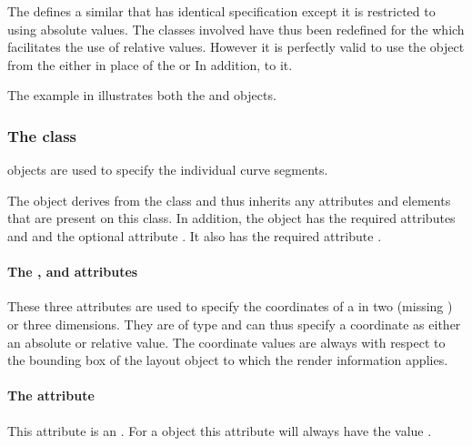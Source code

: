 The \LayoutPackage defines a similar  that has identical specification except it is restricted to using absolute values.  The classes involved have thus been redefined for the \RenderPackage which facilitates the use of relative values. However it is perfectly valid to use the  object from the \LayoutPackage either in place of the \ListOfElements or In addition, to it. 

The example in  illustrates both the \ListOfElements and  objects.

\subsubsection{The  class}
\label{renderpoint-class}

\RenderPoint objects are used to 
specify the individual curve segments.

The \RenderPoint object derives from the \SBase class and thus inherits
any attributes and elements that are present on this class.
In addition, the \RenderPoint object has the required attributes  and  and the optional attribute . It also has the required attribute .

\paragraph{The \fixttspace{}, \fixttspace{} and \fixttspace{} attributes}

These three attributes are used to specify the coordinates of a  \RenderPoint in two (missing ) or three dimensions. They are of type \RelAbsVector and can thus specify a coordinate as either an absolute or relative value. The coordinate
values are always with respect to the bounding box of the layout object to which the
render information applies.

\paragraph{The \fixttspace{} attribute}

This attribute is an . For a \RenderPoint object this attribute will always have the value .


